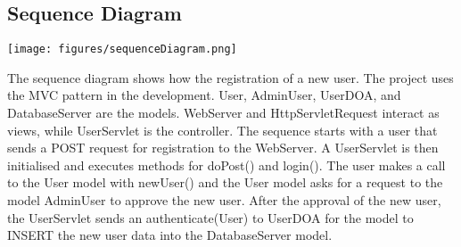 \subsection{Sequence Diagram}

\texttt{[image: figures/sequenceDiagram.png]}


The sequence diagram shows how the registration of a new user.
The project uses the MVC pattern in the development.
User, AdminUser, UserDOA, and DatabaseServer are the models.
WebServer and HttpServletRequest interact as views, while UserServlet is the controller.
The sequence starts with a user that sends a POST request for registration to the WebServer.
A UserServlet is then initialised and executes methods for doPost() and login().
The user makes a call to the User model with newUser() and the User model asks for a request to the model AdminUser to approve the new user.
After the approval of the new user, the UserServlet sends an authenticate(User) to UserDOA for the model to INSERT the new user data into the DatabaseServer model.